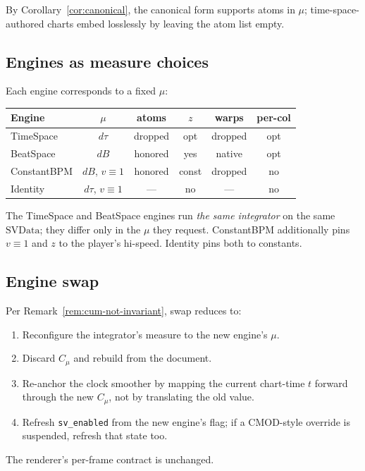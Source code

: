 \documentclass[11pt]{article}
\theoremstyle{definition}
\begin{document}
By Corollary~\ref{cor:canonical}, the canonical form supports atoms in $\mu$;
time-space-authored charts embed losslessly by leaving the atom list empty.

\subsection{Engines as measure choices}

Each engine corresponds to a fixed $\mu$:

\begin{center}
\begin{tabular}{lccccc}
\toprule
Engine & $\mu$ & atoms & $z$ & warps & per-col \\
\midrule
TimeSpace      & $d\tau$           & dropped  & opt   & dropped   & opt \\
BeatSpace      & $dB$              & honored  & yes   & native    & opt \\
ConstantBPM    & $dB$, $v\equiv 1$ & honored  & const & dropped   & no \\
Identity       & $d\tau$, $v\equiv 1$ & ---   & no    & ---       & no \\
\bottomrule
\end{tabular}
\end{center}

The TimeSpace and BeatSpace engines run \emph{the same integrator} on the same
$\mathrm{SVData}$; they differ only in the $\mu$ they request. ConstantBPM
additionally pins $v \equiv 1$ and $z$ to the player's hi-speed. Identity
pins both to constants.

\subsection{Engine swap}
\label{sec:swap}

Per Remark~\ref{rem:cum-not-invariant}, swap reduces to:
\begin{enumerate}[leftmargin=2em]
    \item Reconfigure the integrator's measure to the new engine's $\mu$.
    \item Discard $C_\mu$ and rebuild from the document.
    \item Re-anchor the clock smoother by mapping the current chart-time $t$
          forward through the new $C_\mu$, not by translating the old value.
    \item Refresh \texttt{sv\_enabled} from the new engine's flag; if a
          CMOD-style override is suspended, refresh that state too.
\end{enumerate}
The renderer's per-frame contract is unchanged.
\end{document}
